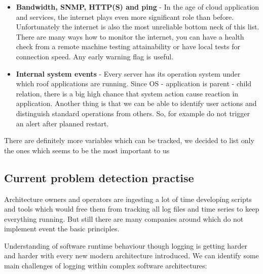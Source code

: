 \begin{itemize}
    \item \textbf{Bandwidth, SNMP, HTTP(S) and ping} - In the age of cloud application and services, the internet plays even more significant role than before. Unfortunately the internet is also the most unreliable bottom neck of this list. There are many ways how to monitor the internet, you can have a health check from a remote machine testing attainability or have local tests for connection speed. Any early warning flag is useful.  
    
    \item \textbf{Internal system events} - Every server has its operation system under which roof applications are running. Since OS - application is parent - child relation, there is a big high chance that system action cause reaction in application. Another thing is that we can be able to identify user actions and distinguish standard operations from others.  So, for example do not trigger an alert after planned restart.
\end{itemize}

There are definitely more variables which can be tracked, we decided to list only the ones which seems to be the most important to us 
\subsection{Current problem detection practise}

Architecture owners and operators are ingesting a lot of time developing scripts and tools which would free them from tracking all log files and time series to keep everything running. But still there are many companies around which do not implement event the basic principles.

Understanding of software runtime behaviour though logging is getting harder and harder with every new modern architecture introduced. We can identify some main challenges of logging within complex software architectures:

